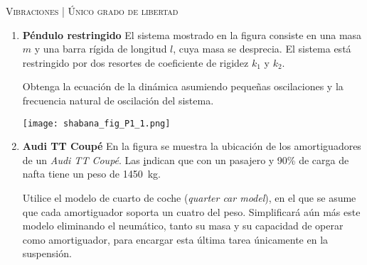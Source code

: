 \documentclass[11pt, spanish, a4paper, twopage]{article}
\begin{document}
\begin{center}
	\textsc{\large Vibraciones | Único grado de libertad}
\end{center}


\begin{enumerate}

				
\item 
\begin{minipage}[t][4cm]{0.65\textwidth}
	\textbf{Péndulo restringido}
	El sistema mostrado en la figura consiste en una masa $m$ y una barra rígida de longitud $l$, cuya masa se desprecia.
	El sistema está restringido por dos resortes de coeficiente de rigidez $k_1$ y $k_2$.

	Obtenga la ecuación de la dinámica asumiendo pequeñas oscilaciones y la frecuencia natural de oscilación del sistema.
\end{minipage}
\begin{minipage}[c][3cm][t]{0.3\textwidth}
	\texttt{[image: shabana\_fig\_P1\_1.png]}
\end{minipage}



\item 
\begin{minipage}[t][6cm]{0.65\textwidth}
	\textbf{Audi TT Coupé}
	En la figura se muestra la ubicación de los amortiguadores de un \emph{Audi TT Coupé}.
	Las \href{https://media.audiusa.com/assets/documents/original/8253-FINAL2021TTTechSpecs.pdf} indican que con un pasajero y 90\% de carga de nafta tiene un peso de \SI{1450}{\kilo\gram}.

	Utilice el modelo de cuarto de coche (\emph{quarter car model}), en el que se asume que cada amortiguador soporta un cuatro del peso.
	Simplificará aún más este modelo eliminando el neumático, tanto su masa y su capacidad de operar como amortiguador, para encargar esta última tarea únicamente en la suspensión.


\end{minipage}
\end{enumerate}
\end{document}
